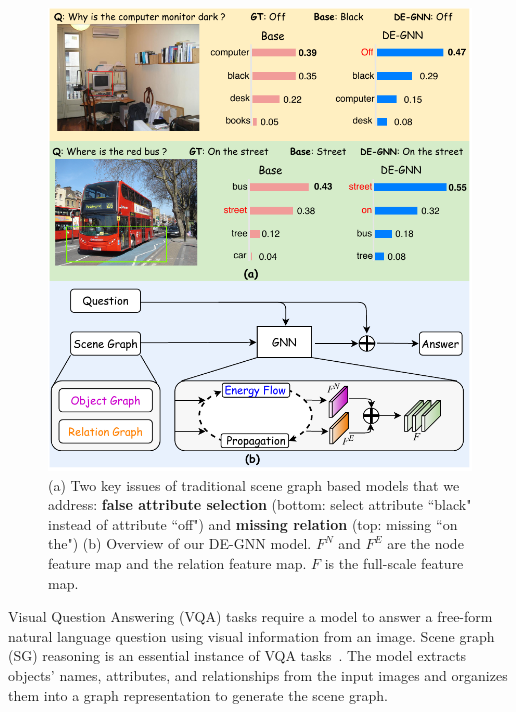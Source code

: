 \documentclass[letterpaper]{article} %
\begin{document}
\begin{figure}[ht] 
    \centering 
    \includegraphics[scale=0.6]{./pic/intro5.pdf} 
    \caption{(a) Two key issues of traditional scene graph based models that we address: \textbf{false attribute selection} (bottom: select attribute ``black" instead of attribute ``off") and \textbf{missing relation} (top: missing ``on the") (b) Overview of our DE-GNN model. $F^N$ and $F^E$ are the node feature map and the relation feature map. $F$ is the full-scale feature map.} 
    \label{scene-graph} 
    \vspace{-0.1in}
\end{figure}

Visual Question Answering (VQA) tasks require a model to answer a free-form natural language question using visual information from an image. Scene graph (SG) reasoning is an essential instance of VQA tasks~\cite{DBLP:journals/corr/abs-2007-01072}. 
The model extracts objects' names, attributes, and relationships from the input images and organizes them into a graph representation to generate the scene graph.
\end{document}
